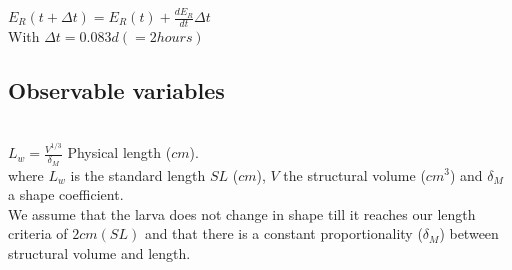 $E_{R}\left ( t + \Delta t \right ) = E_{R}\left ( t \right ) + \frac{dE_{R}}{dt}\Delta t$ \\

With $\Delta t = 0.083 d \left (=2hours\right )$

\subsection*{Observable variables}
\hfill \\

$L_{w} = \frac{V^{1/3}}{\delta_{M}}$ \hfill Physical length ($cm$).\\

where $L_{w}$ is the standard length $SL$ ($cm$), $V$ the structural volume ($cm^3$) and $\delta_{M}$ a shape coefficient.\\

We assume that the larva does not change in shape till it reaches our length criteria of $2cm(SL)$ and that there is a constant proportionality ($\delta_{M}$) between structural volume and length.\\
